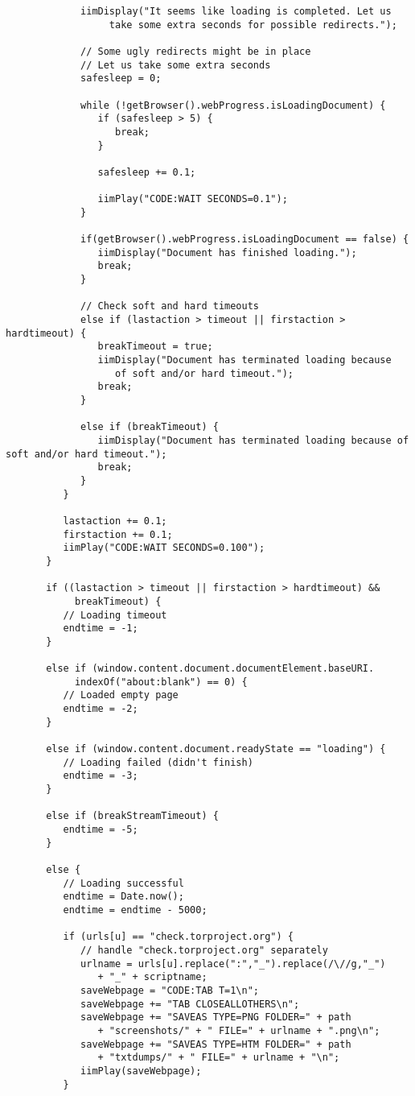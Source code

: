 \begin{verbatim}
             iimDisplay("It seems like loading is completed. Let us 
                  take some extra seconds for possible redirects.");
				
             // Some ugly redirects might be in place
             // Let us take some extra seconds
             safesleep = 0;
					
             while (!getBrowser().webProgress.isLoadingDocument) {
                if (safesleep > 5) {
                   break;
                }
					
                safesleep += 0.1;
						
                iimPlay("CODE:WAIT SECONDS=0.1");
             }
					 
             if(getBrowser().webProgress.isLoadingDocument == false) { 
                iimDisplay("Document has finished loading.");
                break;
             }
				
             // Check soft and hard timeouts
             else if (lastaction > timeout || firstaction > hardtimeout) {
                breakTimeout = true;
                iimDisplay("Document has terminated loading because 
                   of soft and/or hard timeout.");
                break;
             }

             else if (breakTimeout) {
                iimDisplay("Document has terminated loading because of soft and/or hard timeout.");
                break;
             }
          }
			
          lastaction += 0.1;
          firstaction += 0.1;
          iimPlay("CODE:WAIT SECONDS=0.100");
       }
		
       if ((lastaction > timeout || firstaction > hardtimeout) && 
            breakTimeout) {
          // Loading timeout
          endtime = -1;
       } 
		
       else if (window.content.document.documentElement.baseURI.
            indexOf("about:blank") == 0) {
          // Loaded empty page
          endtime = -2;
       } 
		
       else if (window.content.document.readyState == "loading") {
          // Loading failed (didn't finish)
          endtime = -3;
       } 
		
       else if (breakStreamTimeout) {
          endtime = -5;
       } 
		
       else {
          // Loading successful
          endtime = Date.now();
          endtime = endtime - 5000;
			
          if (urls[u] == "check.torproject.org") {
             // handle "check.torproject.org" separately
             urlname = urls[u].replace(":","_").replace(/\//g,"_") 
                + "_" + scriptname;
             saveWebpage = "CODE:TAB T=1\n";
             saveWebpage += "TAB CLOSEALLOTHERS\n";
             saveWebpage += "SAVEAS TYPE=PNG FOLDER=" + path 
                + "screenshots/" + " FILE=" + urlname + ".png\n";
             saveWebpage += "SAVEAS TYPE=HTM FOLDER=" + path 
                + "txtdumps/" + " FILE=" + urlname + "\n";
             iimPlay(saveWebpage);
          } 
			

\end{verbatim}
